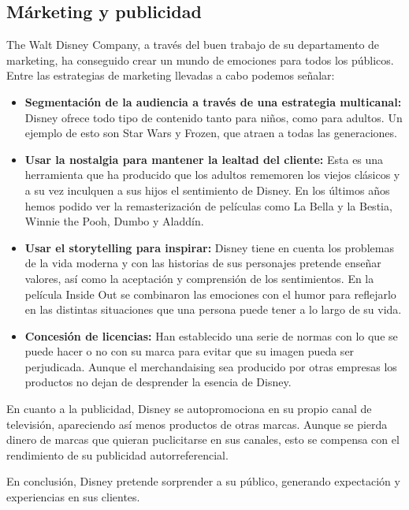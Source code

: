 \subsection{Márketing y publicidad}

The Walt Disney Company, a través del buen trabajo de su departamento de marketing, ha conseguido crear un mundo de emociones para todos los públicos. Entre las estrategias de marketing llevadas a cabo podemos señalar:

\begin{itemize}

\item
\textbf{Segmentación de la audiencia a través de una estrategia multicanal:} Disney ofrece todo tipo de contenido tanto para niños, como para adultos. Un ejemplo de esto son Star Wars y Frozen, que atraen a todas las generaciones.

\item
\textbf{Usar la nostalgia para mantener la lealtad del cliente:} Esta es una herramienta que ha producido que los adultos rememoren los viejos clásicos y a su vez inculquen a sus hijos el sentimiento de Disney. En los últimos años hemos podido ver la remasterización de películas como La Bella y la Bestia, Winnie the Pooh, Dumbo y Aladdín.

\item
\textbf{Usar el storytelling para inspirar:} Disney tiene en cuenta los problemas de la vida moderna y con las historias de sus personajes pretende enseñar valores, así como la aceptación y comprensión de los sentimientos. En la película Inside Out se combinaron las emociones con el humor para reflejarlo en las distintas situaciones que una persona puede tener a lo largo de su vida.

\item
\textbf{Concesión de licencias:} Han establecido una serie de normas con lo que se puede hacer o no con su marca para evitar que su imagen pueda ser perjudicada. Aunque el merchandaising sea producido por otras empresas los productos no dejan de desprender la esencia de Disney.

\end{itemize}

En cuanto a la publicidad, Disney se autopromociona en su propio canal de televisión, apareciendo así menos productos de otras marcas. Aunque se pierda dinero de marcas que quieran puclicitarse en sus canales, esto se compensa con el rendimiento de su publicidad autorreferencial.

En conclusión, Disney pretende sorprender a su público, generando expectación y experiencias en sus clientes.